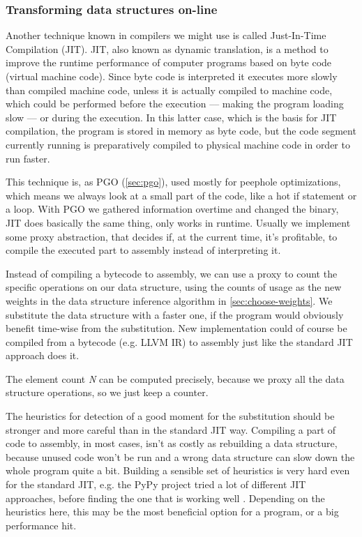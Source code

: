 \documentclass[a4paper,11pt]{article}
\begin{document}
		\subsubsection{Transforming data structures on-line} \label{sec:transforming-on-line}

            Another technique known in compilers we might use is called Just-In-Time Compilation (JIT). JIT, also known
            as dynamic translation, is a method to improve the runtime performance of computer programs based on byte
            code (virtual machine code). Since byte code is interpreted it executes more slowly than compiled machine
            code, unless it is actually compiled to machine code, which could be performed before the execution –-- making
            the program loading slow –-- or during the execution. In this latter case, which is the basis for JIT
            compilation, the program is stored in memory as byte code, but the code segment currently running is
            preparatively compiled to physical machine code in order to run faster.\cite{Wijit}

            This technique is, as PGO (\autoref{sec:pgo}), used mostly for peephole optimizations, which means we always
            look at a small part of the code, like a hot if statement or a loop. With PGO we gathered information
            overtime and changed the binary, JIT does basically the same thing, only works in runtime. Usually we
            implement some proxy abstraction, that decides if, at the current time, it's profitable, to compile the
            executed part to assembly instead of interpreting it.

            Instead of compiling a bytecode to assembly, we can use a proxy to count the specific operations on our
            data structure, using the counts of usage as the new weights in the data structure inference algorithm in
            \autoref{sec:choose-weights}. We substitute the data structure with a faster one, if the program would
            obviously benefit time-wise from the substitution. New implementation could of course be compiled from a
            bytecode (e.g. LLVM IR) to assembly just like the standard JIT approach does it.

            The element count \emph{N} can be computed precisely, because we proxy all the data structure operations, so we
            just keep a counter.

            The heuristics for detection of a good moment for the substitution should be stronger and more careful than
            in the standard JIT way. Compiling a part of code to assembly, in most cases, isn't as costly as
            rebuilding a data structure, because unused code won't be run and a wrong data structure can slow down the
            whole program quite a bit. Building a sensible set of heuristics is very hard even for the standard JIT,
            e.g. the PyPy project tried a lot of different JIT approaches, before finding the one that is working well \cite{PyPy}.
            Depending on the heuristics here, this may be the most beneficial option for a program, or a big performance
            hit.
\end{document}
